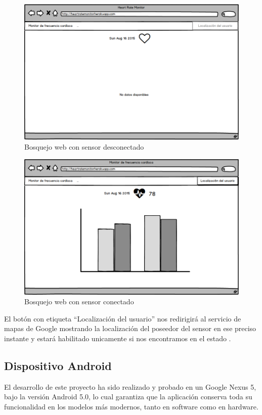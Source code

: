 \begin{figure}[h] \centering
	\includegraphics[width=15cm]{graphs/mockup_web_disconnected_es.png} \caption{Bosquejo web con sensor desconectado}\label{fig:mockup:web:desconectado}
\end{figure}

\begin{figure}[h] \centering
	\includegraphics[width=15cm]{graphs/mockup_web_connected_es.png} \caption{Bosquejo web con sensor conectado}\label{fig:mockup:web:conectado}
\end{figure}

El botón con etiqueta ``Localización del usuario''  nos redirigirá al servicio de mapas de Google mostrando la localización del poseedor del sensor en ese preciso instante y estará habilitado unicamente si nos encontramos en el estado .


\subsection{Dispositivo Android}
    El desarrollo de este proyecto ha sido realizado y probado en un Google Nexus 5, bajo la versión Android 5.0, lo cual garantiza que la aplicación conserva toda su funcionalidad en los modelos más modernos, tanto en software como en hardware. 
    

